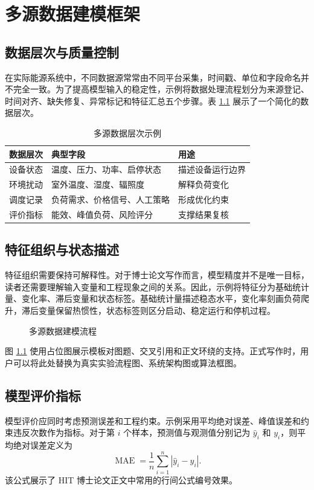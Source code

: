 \chapter{多源数据建模框架}

\section{数据层次与质量控制}

在实际能源系统中，不同数据源常常由不同平台采集，时间戳、单位和字段命名并不完全一致。为了提高模型输入的稳定性，示例将数据处理流程划分为来源登记、时间对齐、缺失修复、异常标记和特征汇总五个步骤。表 \ref{tab:hit-data-layer} 展示了一个简化的数据层次。

\begin{table}[htbp]
  \centering
  \caption{多源数据层次示例}
  \label{tab:hit-data-layer}
  \begin{tabularx}{0.92\textwidth}{@{}lXX@{}}
    \toprule
    数据层次 & 典型字段 & 用途\\
    \midrule
    设备状态 & 温度、压力、功率、启停状态 & 描述设备运行边界\\
    环境扰动 & 室外温度、湿度、辐照度 & 解释负荷变化\\
    调度记录 & 负荷需求、价格信号、人工策略 & 形成优化约束\\
    评价指标 & 能效、峰值负荷、风险评分 & 支撑结果复核\\
    \bottomrule
  \end{tabularx}
\end{table}

\section{特征组织与状态描述}

特征组织需要保持可解释性。对于博士论文写作而言，模型精度并不是唯一目标，读者还需要理解输入变量和工程现象之间的关系。因此，示例将特征分为基础统计量、变化率、滞后变量和状态标签。基础统计量描述稳态水平，变化率刻画负荷爬升，滞后变量保留热惯性，状态标签则区分启动、稳定运行和停机过程。

\begin{figure}[htbp]
  \centering
  \caption{多源数据建模流程}
  \label{fig:hit-model-flow}
\end{figure}

图 \ref{fig:hit-model-flow} 使用占位图展示模板对图题、交叉引用和正文环绕的支持。正式写作时，用户可以将此处替换为真实实验流程图、系统架构图或算法框图。

\section{模型评价指标}

模型评价应同时考虑预测误差和工程约束。示例采用平均绝对误差、峰值误差和约束违反次数作为指标。对于第 $i$ 个样本，预测值与观测值分别记为 $\hat{y}_i$ 和 $y_i$，则平均绝对误差定义为
\begin{equation}
  \operatorname{MAE} = \frac{1}{n}\sum_{i=1}^{n}\left|\hat{y}_i-y_i\right|.
\end{equation}
该公式展示了 HIT 博士论文正文中常用的行间公式编号效果。
